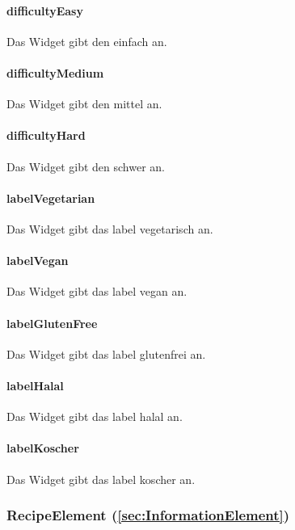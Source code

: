 \documentclass{entwurfsheft}
\begin{document}
\paragraph*{difficultyEasy} Das Widget gibt den  einfach an.
\paragraph*{difficultyMedium} Das Widget gibt den  mittel an.
\paragraph*{difficultyHard} Das Widget gibt den  schwer an.
\paragraph*{labelVegetarian} Das Widget gibt das \gls{label} vegetarisch an.
\paragraph*{labelVegan} Das Widget gibt das \gls{label} vegan an.
\paragraph*{labelGlutenFree} Das Widget gibt das \gls{label} glutenfrei an.
\paragraph*{labelHalal} Das Widget gibt das \gls{label} halal an.
\paragraph*{labelKoscher} Das Widget gibt das \gls{label} koscher an.

\subsubsection*{RecipeElement (\ref{sec:InformationElement})}
\end{document}
